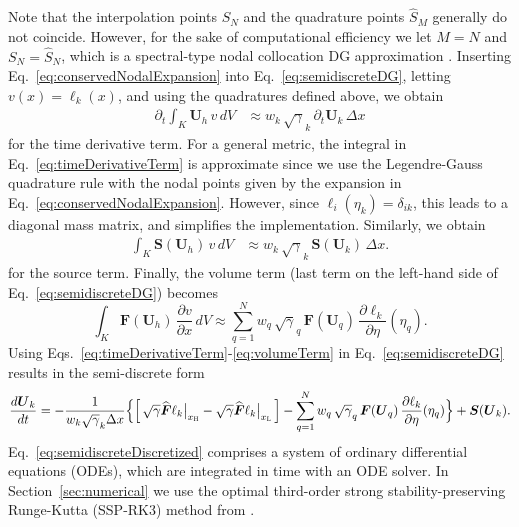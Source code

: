 \documentclass[letterpaper]{jpconf}
\newcommand{\deriv}[2]{\frac{d #1}{d #2}}
\newcommand{\pderiv}[2]{\frac{\partial #1}{\partial #2}}
\newcommand{\vect}[1]{\boldsymbol{#1}}
\newcommand{\f}[2]{\frac{#1}{#2}}
\newcommand{\dx}{\Delta x}
\newcommand{\pd}[2]{\partial_{#2}{#1}}
\newcommand{\xL}{x_{\textnormal{\tiny\textsc{L}}}}
\newcommand{\xH}{x_{\textnormal{\tiny\textsc{H}}}}
\begin{document}
Note that the interpolation points $S_{N}$ and the quadrature points $\hat{S}_{M}$ generally do not coincide.  
However, for the sake of computational efficiency we let $M=N$ and $S_{N}=\hat{S}_{N}$, which is a spectral-type nodal collocation DG approximation \cite{bassi_etal_2013}.  
Inserting Eq.~\eqref{eq:conservedNodalExpansion} into Eq.~\eqref{eq:semidiscreteDG}, letting $v(x)=\ell_{k}(x)$, and using the quadratures defined above, we obtain
\begin{align}
  \pd{}{t}\int_{K}\vect{U}_{h}\,v\,dV
  &\approx w_{k}\,\sqrt{\gamma}_{k}\,\pd{}{t}\vect{U}_{k}\,\dx
  \label{eq:timeDerivativeTerm}
\end{align}
for the time derivative term.  
For a general metric, the integral in Eq.~\eqref{eq:timeDerivativeTerm} is approximate since we use the Legendre-Gauss quadrature rule with the nodal points given by the expansion in Eq.~\eqref{eq:conservedNodalExpansion}.  
However, since $\ell_{i}(\eta_{k})=\delta_{ik}$, this leads to a diagonal mass matrix, and simplifies the implementation.  
Similarly, we obtain
\begin{align}
  \int_{K}\vect{S}(\vect{U}_{h})\,v\,dV
  &\approx w_{k}\,\sqrt{\gamma}_{k}\,\vect{S}(\vect{U}_{k})\,\dx.
  \label{eq:sourceTerm}
\end{align}
for the source term.  
Finally, the volume term (last term on the left-hand side of Eq.~\eqref{eq:semidiscreteDG}) becomes
\begin{equation}
  \int_{K}\vect{F}(\vect{U}_{h})\,\pderiv{v}{x}\,dV
  \approx \sum_{q=1}^{N}w_{q}\,\sqrt{\gamma}_{q}\,\vect{F}(\vect{U}_{q})\,\pderiv{\ell_{k}}{\eta}(\eta_{q}).
  \label{eq:volumeTerm}
\end{equation}
Using Eqs.~\eqref{eq:timeDerivativeTerm}-\eqref{eq:volumeTerm} in Eq.~\eqref{eq:semidiscreteDG} results in the semi-discrete form
\begin{align}
  \deriv{\vect{U}_{k}}{t}
  =-\f{1}{w_{k}\sqrt{\gamma}_{k}\dx}
  \Big\{
  \Big[\,
    \sqrt{\gamma}\widehat{\vect{F}}\ell_{k}\big|_{\xH}
    -\sqrt{\gamma}\widehat{\vect{F}}\ell_{k}\big|_{\xL}
  \,\Big]
  -\sum_{q=1}^{N}w_{q}\,\sqrt{\gamma}_{q}\,\vect{F}(\vect{U}_{q})\,\pderiv{\ell_{k}}{\eta}(\eta_{q})
  \Big\} + \vect{S}(\vect{U}_{k}).
  \label{eq:semidiscreteDiscretized}
\end{align}
Eq.~\eqref{eq:semidiscreteDiscretized} comprises a system of ordinary differential equations (ODEs), which are integrated in time with an ODE solver.  
In Section~\ref{sec:numerical} we use the optimal third-order strong stability-preserving Runge-Kutta (SSP-RK3) method from \cite{shuOsher_1988}.  
\end{document}
